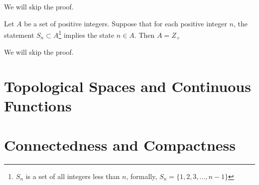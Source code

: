 We will skip the proof.

\begin{theorem}
Let $A$ be a set of positive integers. Suppose that for each positive integer $n$, the statement $S_n \subset A$\footnote{$S_n$ is a set of all integers less than $n$, formally, $S_n = \{1, 2, 3, \dots, n -1\}$} implies the state $n \in A$. Then $A = Z_+$
\end{theorem}

We will skip the proof.


\section{Topological Spaces and Continuous Functions}

\section{Connectedness and Compactness}
